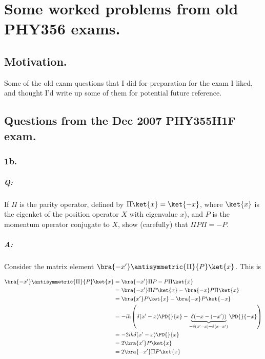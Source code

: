 
%

\chapter{Some worked problems from old PHY356 exams.}
\label{chap:qmIexamPractice}
{}
\date{Dec X, 2010}

\beginArtWithToc

\section{Motivation.}

Some of the old exam questions that I did for preparation for the exam I liked, and thought I'd write up some of them for potential future reference.

\section{Questions from the Dec 2007 PHY355H1F exam.}
\subsection{1b.}

\paragraph{Q:} If $\Pi$ is the parity operator, defined by $\Pi \ket{x} = \ket{-x}$, where $\ket{x}$ is the eigenket of the position operator $X$ with eigenvalue $x$), and $P$ is the momentum operator conjugate to $X$, show (carefully) that $\Pi P \Pi = -P$.

\paragraph{A:}

Consider the matrix element $\bra{-x'} \antisymmetric{\Pi}{P} \ket{x}$.  This is

\begin{align*}
\bra{-x'} \antisymmetric{\Pi}{P} \ket{x}
&=
\bra{-x'} \Pi P - P \Pi \ket{x} \\
&=
\bra{-x'} \Pi P \ket{x} - \bra{-x} P \Pi \ket{x} \\
&=
\bra{x'} P \ket{x} - \bra{-x} P \ket{-x} \\
&=
- i \hbar \left(
\delta(x'-x) \PD{}{x}
-\underbrace{\delta(-x -(-x'))}_{= \delta(x'-x) = \delta(x-x')} \PD{}{-x}
\right) \\
&=
- 2 i \hbar 
\delta(x'-x) \PD{}{x} \\
&=
2 \bra{x'} P \ket{x} \\
&=
2 \bra{-x'} \Pi P \ket{x} \\
\end{align*}

